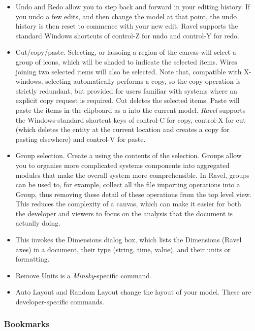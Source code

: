 \label{Edit}
\begin{itemize}
\item \label{edit:undo} Undo and Redo allow you to step back and forward
in your editing history. If you undo a few edits, and then change
the model at that point, the undo history is then reset to commence
with your new edit. Ravel supports the standard Windows shortcuts
of control-Z for undo and control-Y for redo.
\item \label{edit:copy} Cut/copy/paste. Selecting, or lassoing a region
of the canvas will select a group of icons, which will be shaded to
indicate the selected items. Wires joining two selected items will
also be selected. Note that, compatible with X-windows, selecting
automatically performs a copy, so the copy operation is strictly redundant,
but provided for users familiar with systems where an explicit copy
request is required. Cut deletes the selected items. Paste will paste
the items in the clipboard as a  into the
current model. \emph{Ravel} supports the Windows-standard shortcut
keys of control-C for copy, control-X for cut (which deletes the entity
at the current location and creates a copy for pasting elsewhere)
and control-V for paste.
\item \label{edit:group} Group selection. Create a 
using the contents of the selection. Groups allow you to organise
more complicated systems components into aggregated modules that make
the overall system more comprehensible. In Ravel, groups can be used
to, for example, collect all the file importing operations into a
Group, thus removing these detail of these operations from the top
level view. This reduces the complexity of a canvas, which can make
it easier for both the developer and viewers to focus on the analysis
that the document is actually doing.
\item \label{edit: Dimensions} This invokes the Dimensions dialog box,
which lists the Dimensions (Ravel axes) in a document, their type
(string, time, value), and their units or formatting.
\item Remove Units is a \emph{Minsky}-specific command.
\item Auto Layout and Random Layout change the layout of your model. These
are developer-specific commands.
\end{itemize}

\subsubsection{Bookmarks}

